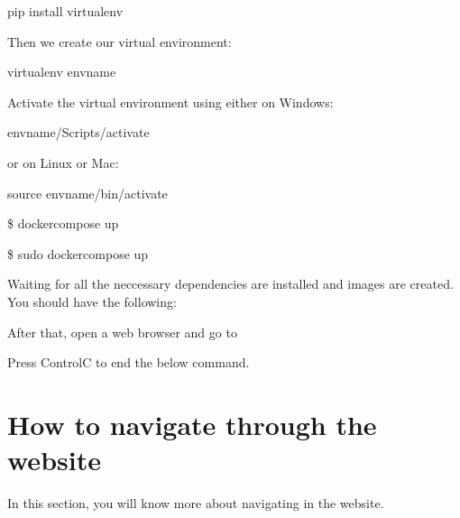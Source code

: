 \documentclass[letterpaper,10pt,english]{sphinxmanual}
\begin{document}
\begin{sphinxVerbatim}[commandchars=\\\{\}]
\PYGZdl{} pip install virtualenv
\end{sphinxVerbatim}

\sphinxAtStartPar
Then we create our virtual environment:

\begin{sphinxVerbatim}[commandchars=\\\{\}]
\PYGZdl{} virtualenv envname
\end{sphinxVerbatim}

\sphinxAtStartPar
Activate the virtual environment using either on Windows:

\begin{sphinxVerbatim}[commandchars=\\\{\}]
\PYGZdl{} envname/Scripts/activate
\end{sphinxVerbatim}

\sphinxAtStartPar
or on Linux or Mac:

\begin{sphinxVerbatim}[commandchars=\\\{\}]
\PYGZdl{} source envname/bin/activate
\end{sphinxVerbatim}
\begin{description}
\sphinxAtStartPar
\$ docker\sphinxhyphen{}compose up

\sphinxAtStartPar
\$ sudo docker\sphinxhyphen{}compose up

\end{description}

\sphinxAtStartPar
Waiting for all the neccessary dependencies are installed and images are created. You should have the following:

\noindent{}

\sphinxAtStartPar
After that, open a web browser and go to 

\sphinxAtStartPar
Press Control\sphinxhyphen{}C to end the below command.

\sphinxstepscope


\chapter{How to navigate through the website}
\label{\detokenize{pages/navigation-bar:how-to-navigate-through-the-website}}\label{\detokenize{pages/navigation-bar::doc}}
\sphinxAtStartPar
In this section, you will know more about navigating in the website.
\end{document}
